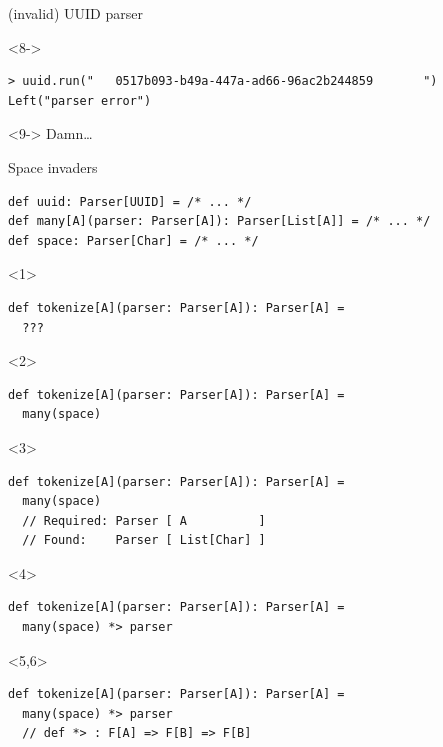 \documentclass[presentation,aspectratio=169,smaller]{beamer}
\begin{document}
\begin{frame}[label={sec:org31c21ab},fragile,t]{(invalid) UUID parser}
\begin{onlyenv}<8->
\begin{verbatim}
> uuid.run("   0517b093-b49a-447a-ad66-96ac2b244859       ")
Left("parser error")
\end{verbatim}
\end{onlyenv}

\begin{onlyenv}<9->
Damn\ldots{}
\end{onlyenv}
\end{frame}

\begin{frame}[label={sec:org324abf0},fragile,t]{Space invaders}
 \begin{verbatim}
def uuid: Parser[UUID] = /* ... */
def many[A](parser: Parser[A]): Parser[List[A]] = /* ... */
def space: Parser[Char] = /* ... */
\end{verbatim}

\begin{onlyenv}<1>
\begin{verbatim}
def tokenize[A](parser: Parser[A]): Parser[A] =
  ???
\end{verbatim}
\end{onlyenv}

\begin{onlyenv}<2>
\begin{verbatim}
def tokenize[A](parser: Parser[A]): Parser[A] =
  many(space)
\end{verbatim}
\end{onlyenv}

\begin{onlyenv}<3>
\begin{verbatim}
def tokenize[A](parser: Parser[A]): Parser[A] =
  many(space)
  // Required: Parser [ A          ]
  // Found:    Parser [ List[Char] ]
\end{verbatim}
\end{onlyenv}

\begin{onlyenv}<4>
\begin{verbatim}
def tokenize[A](parser: Parser[A]): Parser[A] =
  many(space) *> parser
\end{verbatim}
\end{onlyenv}

\begin{onlyenv}<5,6>
\begin{verbatim}
def tokenize[A](parser: Parser[A]): Parser[A] =
  many(space) *> parser
  // def *> : F[A] => F[B] => F[B]
\end{verbatim}
\end{onlyenv}


\end{frame}
\end{document}
